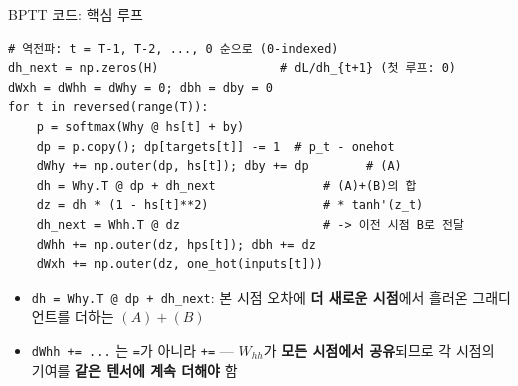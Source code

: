 \documentclass[aspectratio=169,11pt]{beamer}
\begin{document}
\begin{frame}[fragile]{BPTT 코드: 핵심 루프}
\begin{lstlisting}
# 역전파: t = T-1, T-2, ..., 0 순으로 (0-indexed)
dh_next = np.zeros(H)                 # dL/dh_{t+1} (첫 루프: 0)
dWxh = dWhh = dWhy = 0; dbh = dby = 0
for t in reversed(range(T)):
    p = softmax(Why @ hs[t] + by)
    dp = p.copy(); dp[targets[t]] -= 1  # p_t - onehot
    dWhy += np.outer(dp, hs[t]); dby += dp        # (A)
    dh = Why.T @ dp + dh_next               # (A)+(B)의 합
    dz = dh * (1 - hs[t]**2)                # * tanh'(z_t)
    dh_next = Whh.T @ dz                    # -> 이전 시점 B로 전달
    dWhh += np.outer(dz, hps[t]); dbh += dz
    dWxh += np.outer(dz, one_hot(inputs[t]))
\end{lstlisting}
  \begin{itemize}
    \item {} \verb|dh = Why.T @ dp + dh_next|: 본 시점 오차에
      \textbf{더 새로운 시점}에서 흘러온 그래디언트를 더하는 $(A)+(B)$
    \item {} \verb|dWhh += ...| 는 \verb|=|가 아니라 \verb|+=|
      --- $W_{hh}$가 \textbf{모든 시점에서 공유}되므로 각 시점의
      기여를 \textbf{같은 텐서에 계속 더해야} 함
  \end{itemize}
\end{frame}

\end{document}
